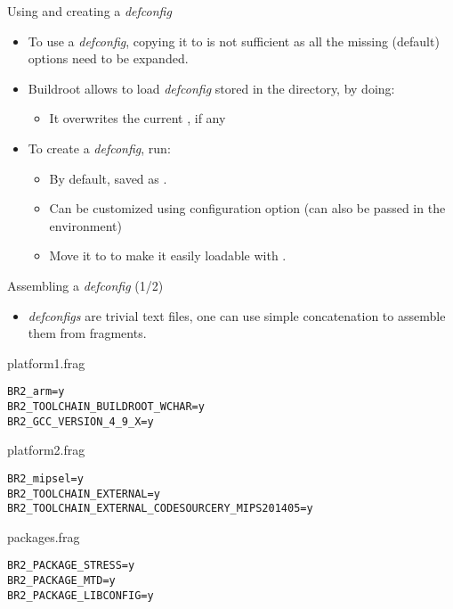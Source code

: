 \begin{frame}{Using and creating a {\em defconfig}}
  \begin{itemize}
  \item To use a {\em defconfig}, copying it to  is not
    sufficient as all the missing (default) options need to be
    expanded.
  \item Buildroot allows to load {\em defconfig} stored in the
     directory, by doing:
    \begin{itemize}
    \item It overwrites the current , if any
    \end{itemize}
  \item To create a {\em defconfig}, run:\\
    \begin{itemize}
    \item By default, saved as .
    \item Can be customized using  configuration
      option (can also be passed in the environment)
    \item Move it to  to make it easily loadable with
      .
    \end{itemize}
  \end{itemize}
\end{frame}

\begin{frame}[fragile]{Assembling a {\em defconfig} (1/2)}

  \begin{itemize}
  \item {\em defconfigs} are trivial text files, one can use simple
    concatenation to assemble them from fragments.
  \end{itemize}

{\small
   \begin{block}{platform1.frag}
\begin{verbatim}
BR2_arm=y
BR2_TOOLCHAIN_BUILDROOT_WCHAR=y
BR2_GCC_VERSION_4_9_X=y
\end{verbatim}
   \end{block}
}

{\small
    \begin{block}{platform2.frag}
\begin{verbatim}
BR2_mipsel=y
BR2_TOOLCHAIN_EXTERNAL=y
BR2_TOOLCHAIN_EXTERNAL_CODESOURCERY_MIPS201405=y
\end{verbatim}
    \end{block}
}

{\small
   \begin{block}{packages.frag}
\begin{verbatim}
BR2_PACKAGE_STRESS=y
BR2_PACKAGE_MTD=y
BR2_PACKAGE_LIBCONFIG=y
\end{verbatim}
   \end{block}
}

\end{frame}

